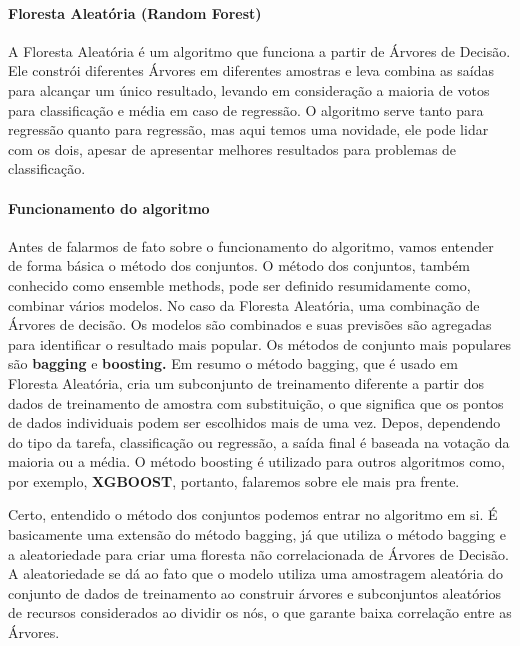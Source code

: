 \documentclass[
  letterpaper,
  DIV=11,
  numbers=noendperiod]{scrreprt}
\let\oldparagraph\paragraph
\renewcommand{\paragraph}[1]{\oldparagraph{#1}\mbox{}}
\begin{document}
\hypertarget{floresta-aleatuxf3ria-random-forest}{%
\paragraph{Floresta Aleatória (Random
Forest)}\label{floresta-aleatuxf3ria-random-forest}}

A Floresta Aleatória é um algoritmo que funciona a partir de Árvores de
Decisão. Ele constrói diferentes Árvores em diferentes amostras e leva
combina as saídas para alcançar um único resultado, levando em
consideração a maioria de votos para classificação e média em caso de
regressão. O algoritmo serve tanto para regressão quanto para regressão,
mas aqui temos uma novidade, ele pode lidar com os dois, apesar de
apresentar melhores resultados para problemas de classificação.

\hypertarget{funcionamento-do-algoritmo}{%
\paragraph{Funcionamento do
algoritmo}\label{funcionamento-do-algoritmo}}

Antes de falarmos de fato sobre o funcionamento do algoritmo, vamos
entender de forma básica o método dos conjuntos. O método dos conjuntos,
também conhecido como ensemble methods, pode ser definido resumidamente
como, combinar vários modelos. No caso da Floresta Aleatória, uma
combinação de Árvores de decisão. Os modelos são combinados e suas
previsões são agregadas para identificar o resultado mais popular. Os
métodos de conjunto mais populares são \textbf{bagging} e
\textbf{boosting.} Em resumo o método bagging, que é usado em Floresta
Aleatória, cria um subconjunto de treinamento diferente a partir dos
dados de treinamento de amostra com substituição, o que significa que os
pontos de dados individuais podem ser escolhidos mais de uma vez. Depos,
dependendo do tipo da tarefa, classificação ou regressão, a saída final
é baseada na votação da maioria ou a média. O método boosting é
utilizado para outros algoritmos como, por exemplo, \textbf{XGBOOST},
portanto, falaremos sobre ele mais pra frente.

Certo, entendido o método dos conjuntos podemos entrar no algoritmo em
si. É basicamente uma extensão do método bagging, já que utiliza o
método bagging e a aleatoriedade para criar uma floresta não
correlacionada de Árvores de Decisão. A aleatoriedade se dá ao fato que
o modelo utiliza uma amostragem aleatória do conjunto de dados de
treinamento ao construir árvores e subconjuntos aleatórios de recursos
considerados ao dividir os nós, o que garante baixa correlação entre as
Árvores.
\end{document}
